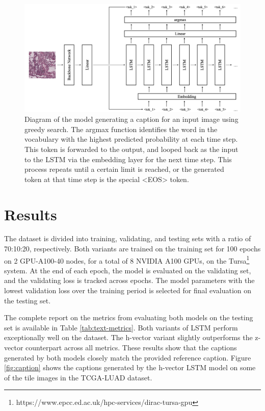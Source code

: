 \documentclass{l4proj}
\begin{document}
\begin{figure}[h!]
    \centering
    \includegraphics[width=1\linewidth]{images/greedy.png}
    \caption{Diagram of the model generating a caption for an input image using greedy search. The argmax function identifies the word in the vocabulary with the highest predicted probability at each time step. This token is forwarded to the output, and looped back as the input to the LSTM via the embedding layer for the next time step. This process repeats until a certain limit is reached, or the generated token at that time step is the special <EOS> token.}
    \label{fig:greedy}
\end{figure}

\section{Results} \label{sec:caption-results}
The dataset is divided into training, validating, and testing sets with a ratio of 70:10:20, respectively. Both variants are trained on the training set for 100 epochs on 2 GPU-A100-40 nodes, for a total of 8 NVIDIA A100 GPUs, on the Tursa\footnote{https://www.epcc.ed.ac.uk/hpc-services/dirac-tursa-gpu} system. At the end of each epoch, the model is evaluated on the validating set, and the validating loss is tracked across epochs. The model parameters with the lowest validation loss over the training period is selected for final evaluation on the testing set.

The complete report on the metrics from evaluating both models on the testing set is available in Table \ref{tab:text-metrics}. Both variants of LSTM perform exceptionally well on the dataset. The h-vector variant slightly outperforms the z-vector counterpart across all metrics. These results show that the captions generated by both models closely match the provided reference caption. Figure \ref{fig:caption} shows the captions generated by the h-vector LSTM model on some of the tile images in the TCGA-LUAD dataset.
\end{document}
